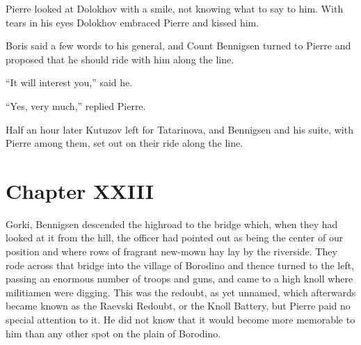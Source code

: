 Pierre looked at Dolokhov with a smile, not knowing what to say
to him.  With tears in his eyes Dolokhov embraced Pierre and
kissed him.

Boris said a few words to his general, and Count Bennigsen turned
to Pierre and proposed that he should ride with him along the
line.

``It will interest you,'' said he.

``Yes, very much,'' replied Pierre.

Half an hour later Kutuzov left for Tatarinova, and Bennigsen and
his suite, with Pierre among them, set out on their ride along
the line.


\chapter*{Chapter XXIII} \ifaudio {}
\fi

 Gorki, Bennigsen descended the highroad to the bridge which,
when they had looked at it from the hill, the officer had pointed
out as being the center of our position and where rows of
fragrant new-mown hay lay by the riverside. They rode across that
bridge into the village of Borodino and thence turned to the
left, passing an enormous number of troops and guns, and came to
a high knoll where militiamen were digging.  This was the
redoubt, as yet unnamed, which afterwards became known as the
Raevski Redoubt, or the Knoll Battery, but Pierre paid no special
attention to it. He did not know that it would become more
memorable to him than any other spot on the plain of Borodino.

